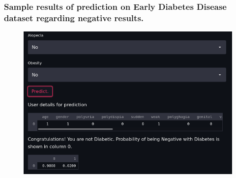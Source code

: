 \documentclass[11pt]{article}
\begin{document}
\subsubsection{Sample results of prediction on Early Diabetes Disease dataset regarding negative results.}
\begin{figure}[h]
	\centerline{\small 
		\includegraphics[height=0.35\textheight]  {Eneg}}
\end{figure}
\end{document}
